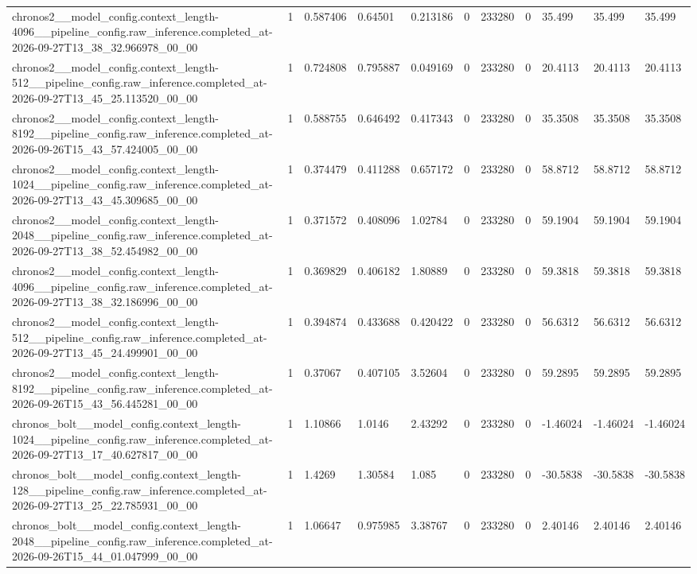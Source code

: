 \begin{tabular}{lllllllllll}
chronos2\_\_model\_config.context\_length-4096\_\_pipeline\_config.raw\_inference.completed\_at-2026-09-27T13\_38\_32.966978\_00\_00 & 1 & 0.587406 & 0.64501 & 0.213186 & 0 & 233280 & 0 & 35.499 & 35.499 & 35.499 \\
chronos2\_\_model\_config.context\_length-512\_\_pipeline\_config.raw\_inference.completed\_at-2026-09-27T13\_45\_25.113520\_00\_00 & 1 & 0.724808 & 0.795887 & 0.049169 & 0 & 233280 & 0 & 20.4113 & 20.4113 & 20.4113 \\
chronos2\_\_model\_config.context\_length-8192\_\_pipeline\_config.raw\_inference.completed\_at-2026-09-26T15\_43\_57.424005\_00\_00 & 1 & 0.588755 & 0.646492 & 0.417343 & 0 & 233280 & 0 & 35.3508 & 35.3508 & 35.3508 \\
chronos2\_\_model\_config.context\_length-1024\_\_pipeline\_config.raw\_inference.completed\_at-2026-09-27T13\_43\_45.309685\_00\_00 & 1 & 0.374479 & 0.411288 & 0.657172 & 0 & 233280 & 0 & 58.8712 & 58.8712 & 58.8712 \\
chronos2\_\_model\_config.context\_length-2048\_\_pipeline\_config.raw\_inference.completed\_at-2026-09-27T13\_38\_52.454982\_00\_00 & 1 & 0.371572 & 0.408096 & 1.02784 & 0 & 233280 & 0 & 59.1904 & 59.1904 & 59.1904 \\
chronos2\_\_model\_config.context\_length-4096\_\_pipeline\_config.raw\_inference.completed\_at-2026-09-27T13\_38\_32.186996\_00\_00 & 1 & 0.369829 & 0.406182 & 1.80889 & 0 & 233280 & 0 & 59.3818 & 59.3818 & 59.3818 \\
chronos2\_\_model\_config.context\_length-512\_\_pipeline\_config.raw\_inference.completed\_at-2026-09-27T13\_45\_24.499901\_00\_00 & 1 & 0.394874 & 0.433688 & 0.420422 & 0 & 233280 & 0 & 56.6312 & 56.6312 & 56.6312 \\
chronos2\_\_model\_config.context\_length-8192\_\_pipeline\_config.raw\_inference.completed\_at-2026-09-26T15\_43\_56.445281\_00\_00 & 1 & 0.37067 & 0.407105 & 3.52604 & 0 & 233280 & 0 & 59.2895 & 59.2895 & 59.2895 \\
chronos\_bolt\_\_model\_config.context\_length-1024\_\_pipeline\_config.raw\_inference.completed\_at-2026-09-27T13\_17\_40.627817\_00\_00 & 1 & 1.10866 & 1.0146 & 2.43292 & 0 & 233280 & 0 & -1.46024 & -1.46024 & -1.46024 \\
chronos\_bolt\_\_model\_config.context\_length-128\_\_pipeline\_config.raw\_inference.completed\_at-2026-09-27T13\_25\_22.785931\_00\_00 & 1 & 1.4269 & 1.30584 & 1.085 & 0 & 233280 & 0 & -30.5838 & -30.5838 & -30.5838 \\
chronos\_bolt\_\_model\_config.context\_length-2048\_\_pipeline\_config.raw\_inference.completed\_at-2026-09-26T15\_44\_01.047999\_00\_00 & 1 & 1.06647 & 0.975985 & 3.38767 & 0 & 233280 & 0 & 2.40146 & 2.40146 & 2.40146 \\

\end{tabular}
